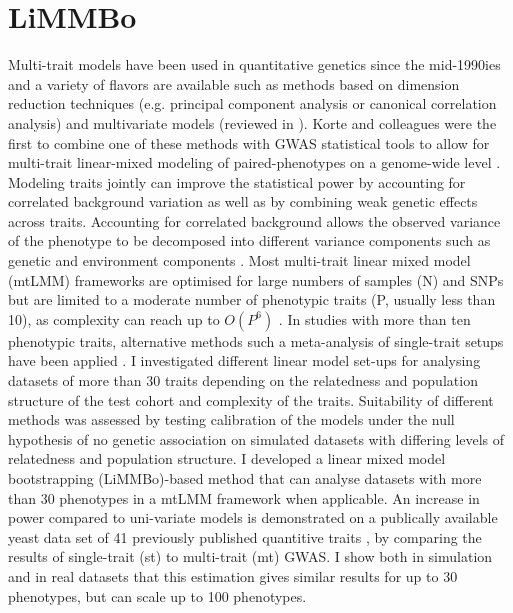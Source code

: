 \section{LiMMBo}
\label{section:limmbo}
Multi-trait models have been used in quantitative genetics since the mid-1990ies \citep{Jiang1995} and a variety of flavors are available such as methods based on dimension reduction techniques (e.g. principal component analysis or canonical correlation analysis) and multivariate models (reviewed in \citep{Shriner2012}). Korte and colleagues were the first to combine one of these methods with GWAS statistical tools to allow for multi-trait linear-mixed modeling of paired-phenotypes on a genome-wide level \citeyearpar{Korte2012}. Modeling traits jointly can improve the statistical power by accounting for correlated background variation as well as by combining weak genetic effects across traits. Accounting for correlated background allows the observed variance of the phenotype to be decomposed into different variance components such as genetic and environment components \citep{Korte2012}. Most multi-trait linear mixed model (mtLMM) frameworks are optimised for large numbers of samples (N) and SNPs but are limited to a moderate number of phenotypic traits (P, usually less than 10), as complexity can reach up to \(O(P^6)\) \citep{Zhou2014,Casale2015}.  In studies with more than ten phenotypic traits, alternative methods such a meta-analysis of single-trait setups have been applied \citep{Bolormaa2014}. I investigated different linear model set-ups for analysing datasets of more than 30 traits depending on the relatedness and population structure of the test cohort and complexity of the traits. Suitability of different methods was assessed by testing calibration of the models under the null hypothesis of no genetic association on simulated datasets with differing levels of relatedness and population structure. I developed a linear mixed model bootstrapping (LiMMBo)-based method that can analyse datasets with more than 30 phenotypes in a mtLMM framework when applicable. An increase in power compared to uni-variate models is demonstrated on a publically available yeast data set of 41 previously published quantitive traits \citep{Bloom2013}, by comparing the results of single-trait (st) to multi-trait (mt) GWAS. I show both in simulation and in real datasets that this estimation gives similar results for up to 30 phenotypes, but can scale up to 100 phenotypes.


